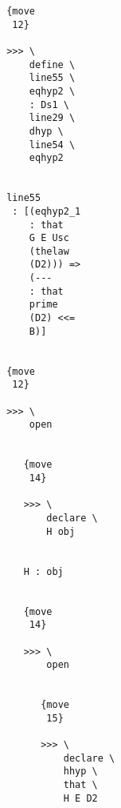 \documentclass[12pt]{article}
\begin{document}
\begin{verbatim}
                                       {move 
                                        12}

                                       >>> \
                                           define \
                                           line55 \
                                           eqhyp2 \
                                           : Ds1 \
                                           line29 \
                                           dhyp \
                                           line54 \
                                           eqhyp2


                                       line55 
                                        : [(eqhyp2_1 
                                           : that 
                                           G E Usc 
                                           (thelaw 
                                           (D2))) => 
                                           (--- 
                                           : that 
                                           prime 
                                           (D2) <<= 
                                           B)]


                                       {move 
                                        12}

                                       >>> \
                                           open


                                          {move 
                                           14}

                                          >>> \
                                              declare \
                                              H obj


                                          H : obj


                                          {move 
                                           14}

                                          >>> \
                                              open


                                             {move 
                                              15}

                                             >>> \
                                                 declare \
                                                 hhyp \
                                                 that \
                                                 H E D2



\end{verbatim}
\end{document}
